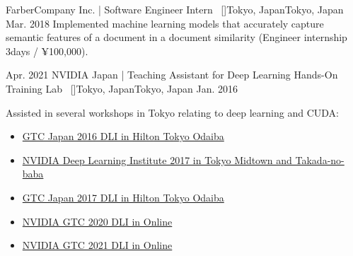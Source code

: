 \begin{experiences}
    \emptySeparator
    \researchexperience
    {}   {FarberCompany Inc. | Software Engineer Intern{\normalfont  ~ [\href{https://www.fabercompany.co.jp/}{\small{\websiteSymbol}}]}}{Tokyo, Japan}{Tokyo, Japan}
    {Mar. 2018} {
    Implemented machine learning models that accurately capture semantic features of a document in a document similarity (Engineer internship 3days / ¥100,000).
    }

    \emptySeparator
    \researchexperience
    {Apr. 2021}   {NVIDIA Japan | Teaching Assistant for Deep Learning Hands-On Training Lab{\normalfont  ~ [\href{https://www.nvidia.com/ja-jp/}{\small{\websiteSymbol}}]}}{Tokyo, Japan}{Tokyo, Japan}
    {Jan. 2016} {
    Assisted in several workshops in Tokyo relating to deep learning and CUDA:
    \begin{itemize}
        \item \href{https://nvidia.connpass.com/event/39743/}{GTC Japan 2016 DLI in Hilton Tokyo Odaiba}
        \item \href{https://nvidia.connpass.com/event/54780/}{NVIDIA Deep Learning Institute 2017 in Tokyo Midtown and Takada-no-baba}
        \item \href{https://nvidia.connpass.com/event/68912/}{GTC Japan 2017 DLI in Hilton Tokyo Odaiba}
        \item \href{https://nvidia.connpass.com/event/189637/}{NVIDIA GTC 2020 DLI in Online}
        \item \href{https://nvidia.connpass.com/event/208506/}{NVIDIA GTC 2021 DLI in Online}
    \end{itemize}
    }


\end{experiences}
